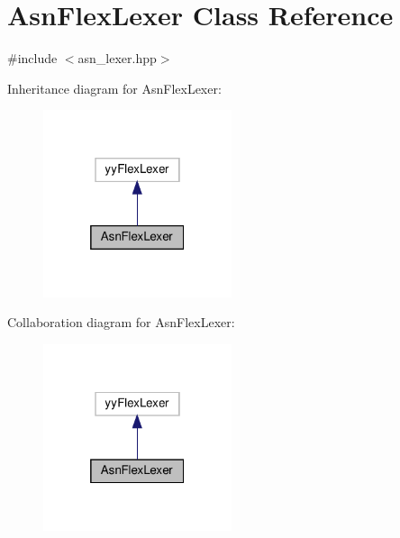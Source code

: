 \hypertarget{classAsnFlexLexer}{}\section{Asn\+Flex\+Lexer Class Reference}
\label{classAsnFlexLexer}


{\ttfamily \#include $<$asn\+\_\+lexer.\+hpp$>$}



Inheritance diagram for Asn\+Flex\+Lexer\+:
\nopagebreak
\begin{figure}[H]
\begin{center}
\leavevmode
\includegraphics[width=157pt]{de/dcf/classAsnFlexLexer__inherit__graph}
\end{center}
\end{figure}


Collaboration diagram for Asn\+Flex\+Lexer\+:
\nopagebreak
\begin{figure}[H]
\begin{center}
\leavevmode
\includegraphics[width=157pt]{d3/d57/classAsnFlexLexer__coll__graph}
\end{center}
\end{figure}
